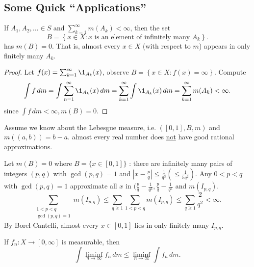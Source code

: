 \subsection{Some Quick ``Applications''}

\begin{theorem}
	If $A_1, A_2, \ldots \in S$ and $\sum_{k = 1}^{\infty} m(A_k) < \infty$, then the set
	\[
		B = \left\{x \in X : x \textrm{ is an element of infinitely many } A_k \right\}.
	\]
	has $m(B) = 0$.
	That is, almost every $x \in X$ (with respect to $m$) appears in only finitely many $A_k$.
\end{theorem}

\begin{proof}
	Let $f(x) = \sum_{k = 1}^{\infty} \1_{A_k}(x)$, observe $B = \left\{x \in X : f(x) = \infty \right\}$.
	Compute
	\[
		\int f \, dm = \int \sum_{n = 1}^{\infty} \1_{A_k}(x) \, dm = \sum_{k = 1}^{\infty} \int \1_{A_k}(x) \, dm = \sum_{k = 1}^{\infty} m(A_k) < \infty.
	\]
	since $\int f \, dm < \infty, m(B) = 0$.
\end{proof}

\begin{example}[Application]
Assume we know about the Lebesgue measure, i.e. $([0,1], B, m)$ and $m((a,b)) = b - a$.
almost every real number does \underline{not} have good rational approximations.
\end{example}

\begin{theorem}
	Let $m(B) = 0$ where $B = \{ x \in [0,1] \}$ : there are infinitely many pairs of integers $(p,q)$ with $\gcd (p, q) = 1$ and $\left| x - \frac{p}{q} \right| \leq \frac{1}{q^3} \left( \leq \frac{1}{5q^2} \right)$.
	Any $0 < p < q$ with $\gcd(p,q) = 1$ approximate all $x$ in $(\frac{p}{q} - \frac{1}{q^3}, \frac{p}{q} - \frac{1}{q^3}$ and $m(I_{p,q})$.
	\[
		\sum_{\substack{1 < p < q \\ \gcd (p, q) = 1}} m(I_{p,q}) \leq \sum_{q \geq 1} \sum_{1 < p < q} m(I_{p, q}) \leq \sum_{q \geq 1}^{} \frac{2}{q^2} < \infty.
	\]
	By Borel-Cantelli, almost every $x \in [0,1]$ lies in only finitely many $I_{p,q}$.
\end{theorem}

\begin{lemma}
	If $f_n : X \to [0, \infty]$ is measurable, then
	\[
		\int \liminf_{n \to \infty} f_n \, dm \leq \liminf_{n \to \infty} \int f_n \, dm.
	\]
\end{lemma}

